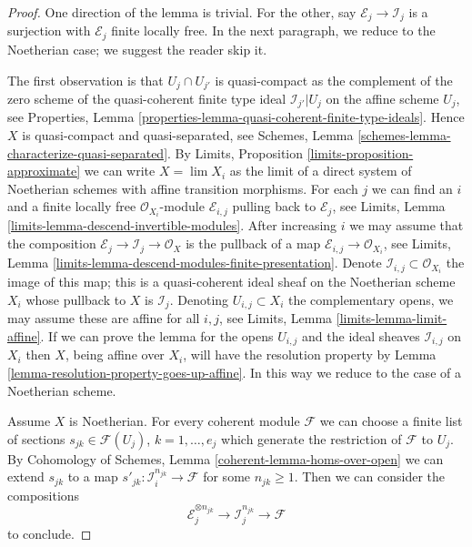 \begin{proof}
One direction of the lemma is trivial. For the other, 
say $\mathcal{E}_j \to \mathcal{I}_j$ is a surjection with
$\mathcal{E}_j$ finite locally free. In the next paragraph, we
reduce to the Noetherian case; we suggest the reader skip it.

\medskip\noindent
The first observation is that $U_j \cap U_{j'}$ is quasi-compact
as the complement of the zero scheme of the quasi-coherent finite type ideal
$\mathcal{I}_{j'}|{U_j}$ on the affine scheme $U_j$, see
Properties, Lemma \ref{properties-lemma-quasi-coherent-finite-type-ideals}.
Hence $X$ is quasi-compact and quasi-separated, see
Schemes, Lemma \ref{schemes-lemma-characterize-quasi-separated}.
By Limits, Proposition \ref{limits-proposition-approximate}
we can write $X = \lim X_i$ as the limit of a direct system of
Noetherian schemes with affine transition morphisms. For each $j$
we can find an $i$ and a finite locally free $\mathcal{O}_{X_i}$-module
$\mathcal{E}_{i, j}$ pulling back to $\mathcal{E}_j$, see
Limits, Lemma \ref{limits-lemma-descend-invertible-modules}.
After increasing $i$ we may assume that the composition
$\mathcal{E}_j \to \mathcal{I}_j \to \mathcal{O}_X$ is the
pullback of a map $\mathcal{E}_{i, j} \to \mathcal{O}_{X_i}$, see
Limits, Lemma \ref{limits-lemma-descend-modules-finite-presentation}.
Denote $\mathcal{I}_{i, j} \subset \mathcal{O}_{X_i}$ the image
of this map; this is a quasi-coherent ideal sheaf on the Noetherian
scheme $X_i$ whose pullback to $X$ is $\mathcal{I}_j$.
Denoting $U_{i, j} \subset X_i$ the complementary opens, we
may assume these are affine for all $i, j$, see
Limits, Lemma \ref{limits-lemma-limit-affine}.
If we can prove the lemma for the opens $U_{i, j}$ and the
ideal sheaves $\mathcal{I}_{i, j}$ on $X_i$ then $X$, being affine
over $X_i$, will have the resolution property by
Lemma \ref{lemma-resolution-property-goes-up-affine}.
In this way we reduce to the case of a Noetherian scheme.

\medskip\noindent
Assume $X$ is Noetherian. For every coherent module $\mathcal{F}$
we can choose a finite list of sections $s_{jk} \in \mathcal{F}(U_j)$,
$k = 1, \ldots, e_j$ which generate the restriction of $\mathcal{F}$ to $U_j$.
By Cohomology of Schemes, Lemma \ref{coherent-lemma-homs-over-open}
we can extend $s_{jk}$ to a map
$s'_{jk} : \mathcal{I}_i^{n_{jk}} \to \mathcal{F}$ for some $n_{jk} \geq 1$.
Then we can consider the compositions
$$
\mathcal{E}_j^{\otimes n_{jk}} \to \mathcal{I}_j^{n_{jk}} \to \mathcal{F}
$$
to conclude.
\end{proof}

